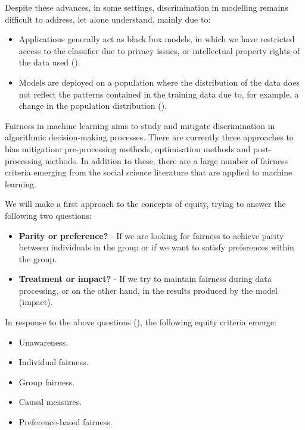\clearpage

Despite these advances, in some settings, discrimination in modelling remains difficult to address, let alone understand, mainly due to: 

\begin{itemize}
    \item Applications generally act as black box models, in which we have restricted access to the classifier due to privacy issues, or intellectual property rights of the data used (\cite{blackbox2014}).
	\item Models are deployed on a population where the distribution of the data does not reflect the patterns contained in the training data due to, for example, a change in the population distribution (\cite{distributionmodel2017}).
\end{itemize}

Fairness in machine learning aims to study and mitigate discrimination in algorithmic decision-making processes. There are currently three approaches to bias mitigation: pre-processing methods, optimisation methods and post-processing methods. In addition to these, there are a large number of fairness criteria emerging from the social science literature that are applied to machine learning. 

We will make a first approach to the concepts of equity, trying to answer the following two questions:

\begin{itemize}
    \item \textbf{Parity or preference?} - If we are looking for fairness to achieve parity between individuals in the group or if we want to satisfy preferences within the group.
    \item \textbf{Treatment or impact?} - If we try to maintain fairness during data processing, or on the other hand, in the results produced by the model (impact).
\end{itemize}

In response to the above questions (\cite{formalizing2018}), the following equity criteria emerge:

\begin{itemize}
    \item Unawareness.
    \item Individual fairness.
    \item Group fairness.
    \item Causal measures.
    \item Preference-based fairness.
\end{itemize}

